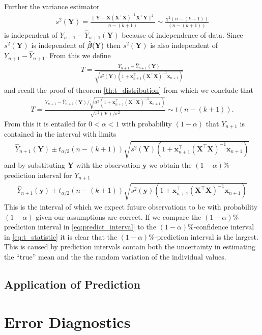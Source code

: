 Further the variance estimator
\begin{align*}
    s^2(\textbf{Y})=\frac{\|\textbf{Y} - \textbf{X}( \textbf{X}^\top\textbf{X} )^{-1}\textbf{X}^\top\textbf{Y}\|^2}{n-(k+1)} \sim \frac{\chi^2(n-(k+1))}{(n-(k+1))}
\end{align*}
is independent of $Y_{n+1}-\hat{Y}_{n+1}(\textbf{Y})$ because of independence of data.
Since $s^2(\textbf{Y})$ is independent of $\hat{\operatorname{\boldsymbol{\beta}}}(\textbf{Y})$ then $s^2(\textbf{Y})$ is also independent of $Y_{n+1}-\hat{Y}_{n+1}$.
From this we define
\begin{align*}
    T=\frac{Y_{n+1}-\hat{Y}_{n+1}(\textbf{Y})}{\sqrt{s^2(\textbf{Y})(1+\textbf{x}^\top_{n+1}(\textbf{X}^\top\textbf{X})^{-1}\textbf{x}_{n+1})}}
\end{align*}
and recall the proof of theorem \ref{th:t_distribution} from which we conclude that
\begin{align*}
    T=\frac{Y_{n+1}-\hat{Y}_{n+1}(\textbf{Y})/\sqrt{\sigma^2(1+\textbf{x}^\top_{n+1}(\textbf{X}^\top\textbf{X})^{-1}\textbf{x}_{n+1})}}{\sqrt{s^2(\textbf{Y})/\sigma^2}} \sim t(n-(k+1)).
\end{align*}
From this it is entailed for $0<\alpha<1$ with probability $(1-\alpha)$ that $Y_{n+1}$ is contained in the interval with limits
\begin{align*}
    \hat{Y}_{n+1}(\textbf{Y})\pm t_{\alpha/2}(n-(k+1))\sqrt{s^2(\textbf{Y})(1+\textbf{x}^\top_{n+1}(\textbf{X}^\top\textbf{X})^{-1}\textbf{x}_{n+1})}
\end{align*}
and by substituting $\textbf{Y}$ with the observation $\textbf{y}$ we obtain the $(1-\alpha)\%$-prediction interval for $Y_{n+1}$
\begin{align} \label{eq:predict_interval}
    \hat{Y}_{n+1}(\textbf{y})\pm t_{\alpha/2}(n-(k+1))\sqrt{s^2(\textbf{y})(1+\textbf{x}^\top_{n+1}(\textbf{X}^\top\textbf{X})^{-1}\textbf{x}_{n+1})}
\end{align}
This is the interval of which we expect future observations to be with probability $(1-\alpha)$ given our assumptions are correct.
If we compare the $(1-\alpha)\%$-prediction interval in \eqref{eq:predict_interval} to the $(1-\alpha)\%$-confidence interval in \eqref{eq:t_statistic} it is clear that the $(1-\alpha)\%$-prediction interval is the largest.
This is caused by prediction intervals contain both the uncertainty in estimating the ``true'' mean and the the random variation of the individual values.

\subsection{Application of Prediction}\label{subsec:app_of_prediction}


\section{Error Diagnostics}